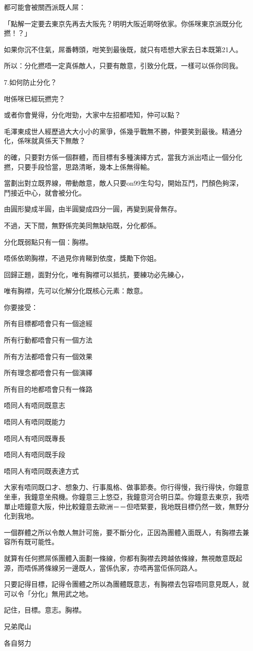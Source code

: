 都可能會被關西派既人屌：

「點解一定要去東京先再去大阪先？明明大阪近啲呀依家。你係咪東京派既分化撚！？」

如果你沉不住氣，屌番轉頭，咁笑到最後既，就只有唔想大家去日本既第21人。

所以：分化撚唔一定真係敵人，只要有敵意，引致分化既，一樣可以係你同我。

7.如何防止分化？

咁係咪已經玩撚完？

或者你會覺得，分化咁勁，大家中左招都唔知，仲可以點？

毛澤東成世人經歷過大大小小的黨爭，係幾乎戰無不勝，仲要笑到最後。精通分化，係咪就真係天下無敵？

的確，只要對方係一個群體，而目標有多種演繹方式，當我方派出唔止一個分化撚，只要手段恰當，思路清晰，幾本上係無得輸。

當劃出對立既界線，帶動敵意，敵人只要on99生勾勾，開始互鬥，鬥顏色夠深，鬥接近中心，就會被分化。

由圓形變成半圓，由半圓變成四分一圓，再變到屍骨無存。

不過，天下間，無野係完美同無缺陷既，分化都係。

分化既弱點只有一個：胸襟。

唔係依啲胸襟，不過見你肯睇到依度，獎勵下你姐。

回歸正題，面對分化，唯有胸襟可以抵抗，要練功必先練心，

唯有胸襟，先可以化解分化既核心元素：敵意。

你要接受：

所有目標都唔會只有一個途經

所有行動都唔會只有一個方法

所有方法都唔會只有一個效果

所有理念都唔會只有一個演繹

所有目的地都唔會只有一條路

唔同人有唔同既意志

唔同人有唔同既能力

唔同人有唔同既專長

唔同人有唔同既手段

唔同人有唔同既表達方式

大家有唔同既口才、想象力、行事風格、做事節奏。你行得慢，我行得快，你鐘意坐車，我鐘意坐飛機。你鐘意三上悠亞，我鐘意河合明日菜。你鐘意去東京，我唔單止唔鐘意大阪，仲比較鐘意去歐洲－－但唔緊要，我地既目標仍然一致，無野分化到我地。

一個群體之所以令敵人無計可施，要不斷分化，正因為團體入面既人，有胸襟去兼容所有既可能性。

就算有任何撚屌係團體入面劃一條線，你都有胸襟去跨越依條線，無視敵意既起源，而唔係將條線另一邊既人，當係仇家，亦唔再當佢係同路人。

只要記得目標，記得令團體之所以為團體既意志，有胸襟去包容唔同意見既人，就可以令「分化」無用武之地。

記住，目標。意志。胸襟。

兄弟爬山

各自努力

